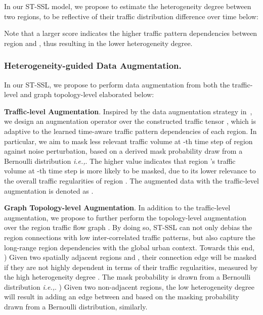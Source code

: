 \documentclass[letterpaper]{article} \usepackage{aaai23}  \usepackage{times}  \usepackage{helvet}  \usepackage{courier}  \usepackage[hyphens]{url}  \usepackage{graphicx} \urlstyle{rm} \def\UrlFont{\rm}  \usepackage{natbib}  \usepackage{caption} \frenchspacing  \setlength{\pdfpagewidth}{8.5in} \setlength{\pdfpageheight}{11in}
\newcommand{\ie}{\emph{i.e.,}\xspace}
\newcommand{\name}{ST-SSL\xspace}
\begin{document}
In our \name model, we propose to estimate the heterogeneity degree between two regions, to be reflective of their traffic distribution difference over time below:

\noindent Note that a larger  score indicates the higher traffic pattern dependencies between region  and , thus resulting in the lower heterogeneity degree.



\subsubsection{Heterogeneity-guided Data Augmentation.}


In our \name, we propose to perform data augmentation from both the traffic-level and graph topology-level elaborated below:\\\vspace{-0.12in}



\noindent \textbf{Traffic-level Augmentation}. Inspired by the data augmentation strategy in~\cite{zhu2021graph}, we design an augmentation operator over the constructed traffic tensor , which is adaptive to the learned time-aware traffic pattern dependencies of each region. In particular, we aim to mask less relevant traffic volume at -th time step of region  against noise perturbation, based on a derived mask probability  draw from a Bernoulli distribution \ie . The higher  value indicates that region 's traffic volume  at -th time step is more likely to be masked, due to its lower relevance to the overall traffic regularities of region . The augmented data with the traffic-level augmentation is denoted as .\\\vspace{-0.12in}



\noindent \textbf{Graph Topology-level Augmentation}.
In addition to the traffic-level augmentation, we propose to further perform the topology-level augmentation over the region traffic flow graph . By doing so, \name can not only debias the region connections with low inter-correlated traffic patterns, but also capture the long-range region dependencies with the global urban context. Towards this end, ) Given two spatially adjacent regions  and , their connection edge  will be masked if they are not highly dependent in terms of their traffic regularities, measured by the high heterogeneity degree . The mask probability  is drawn from a Bernoulli distribution \ie . ) Given two non-adjacent regions, the low heterogeneity degree  will result in adding an edge between  and  based on the masking probability drawn from a Bernoulli distribution,  similarly.
\end{document}
